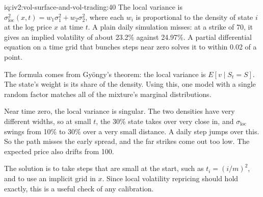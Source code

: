 \begin{solution}{iq:iv2:vol-surface-and-vol-trading:40}
The local variance is $\sigma^2_{\text{loc}}(x, t) = w_1\sigma_1^2 + w_2\sigma_2^2$, where each $w_i$ is proportional to the density of state $i$ at the log price $x$ at time $t$. A plain daily simulation misses: at a strike of 70, it gives an implied volatility of about 23.2\% against 24.97\%. A partial differential equation on a time grid that bunches steps near zero solves it to within 0.02 of a point.

The formula comes from Gyöngy's theorem: the local variance is $E[v \mid S_t = S]$. The state's weight is its share of the density. Using this, one model with a single random factor matches all of the mixture's marginal distributions.

Near time zero, the local variance is singular. The two densities have very different widths, so at small $t$, the 30\% state takes over very close in, and $\sigma_{\text{loc}}$ swings from 10\% to 30\% over a very small distance. A daily step jumps over this. So the path misses the early spread, and the far strikes come out too low. The expected price also drifts from 100.

The solution is to take steps that are small at the start, such as $t_i = (i/m)^2$, and to use an implicit grid in $x$. Since local volatility repricing should hold exactly, this is a useful check of any calibration.

\end{solution}
